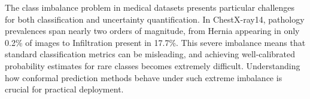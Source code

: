The class imbalance problem in medical datasets presents particular challenges for both classification and uncertainty quantification.
In ChestX-ray14, pathology prevalences span nearly two orders of magnitude, from Hernia appearing in only 0.2\% of images to Infiltration present in 17.7\%.
This severe imbalance means that standard classification metrics can be misleading, and achieving well-calibrated probability estimates for rare classes becomes extremely difficult.
Understanding how conformal prediction methods behave under such extreme imbalance is crucial for practical deployment.
